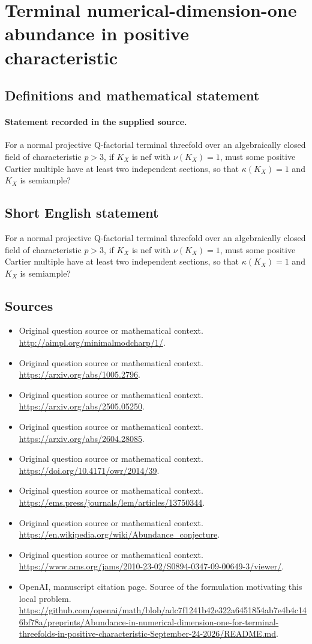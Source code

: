 \documentclass[11pt]{article}
\begin{document}
\section*{Terminal numerical-dimension-one abundance in positive characteristic}\label{30007071}
\subsection{Definitions and mathematical statement}
\paragraph{Statement recorded in the supplied source.}
For a normal projective Q-factorial terminal threefold over an algebraically closed field of characteristic $p>3$, if $K_X$ is nef with $\nu (K_X)=1$, must some positive Cartier multiple have at least two independent sections, so that $\kappa (K_X)=1$ and $K_X$ is semiample?
\subsection{Short English statement}
For a normal projective Q-factorial terminal threefold over an algebraically closed field of characteristic $p>3$, if $K_X$ is nef with $\nu (K_X)=1$, must some positive Cartier multiple have at least two independent sections, so that $\kappa (K_X)=1$ and $K_X$ is semiample?
\subsection{Sources}
\begin{itemize}
\item[S1] Original question source or mathematical context.
\url{http://aimpl.org/minimalmodcharp/1/}.
\item[S2] Original question source or mathematical context.
\url{https://arxiv.org/abs/1005.2796}.
\item[S3] Original question source or mathematical context.
\url{https://arxiv.org/abs/2505.05250}.
\item[S4] Original question source or mathematical context.
\url{https://arxiv.org/abs/2604.28085}.
\item[S5] Original question source or mathematical context.
\url{https://doi.org/10.4171/owr/2014/39}.
\item[S6] Original question source or mathematical context.
\url{https://ems.press/journals/lem/articles/13750344}.
\item[S7] Original question source or mathematical context.
\url{https://en.wikipedia.org/wiki/Abundance_conjecture}.
\item[S8] Original question source or mathematical context.
\url{https://www.ams.org/jams/2010-23-02/S0894-0347-09-00649-3/viewer/}.
\item[S9] OpenAI, manuscript citation page. Source of the formulation motivating this local problem.
\url{https://github.com/openai/math/blob/adc7f1241b42e322a6451854ab7e4b4c146bf78a/preprints/Abundance-in-numerical-dimension-one-for-terminal-threefolds-in-positive-characteristic-September-24-2026/README.md}.
\end{itemize}
\end{document}
